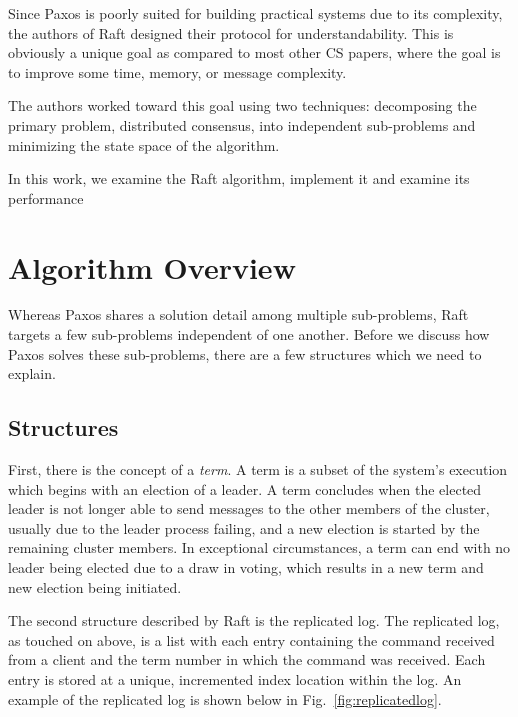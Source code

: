 Since Paxos is poorly suited for building practical systems due to its complexity, the authors of Raft designed their protocol for understandability.
This is obviously a unique goal as compared to most other CS papers, where the goal is to improve some time, memory, or message complexity.

The authors worked toward this goal using two techniques: decomposing the primary problem, distributed consensus, into independent sub-problems and minimizing the state space of the algorithm.

In this work, we examine the Raft algorithm, implement it and examine its performance

\section{Algorithm Overview}

Whereas Paxos shares a solution detail among multiple sub-problems, Raft targets a few sub-problems independent of one another.
Before we discuss how Paxos solves these sub-problems, there are a few structures which we need to explain.

\subsection{Structures}
First, there is the concept of a \textit{term}.
A term is a subset of the system's execution which begins with an election of a leader.
A term concludes when the elected leader is not longer able to send messages to the other members of the cluster, usually due to the leader process failing, and a new election is started by the remaining cluster members.
In exceptional circumstances, a term can end with no leader being elected due to a draw in voting, which results in a new term and new election being initiated.

The second structure described by Raft is the replicated log.
The replicated log, as touched on above, is a list with each entry containing the command received from a client and the term number in which the command was received. Each entry is stored at a unique, incremented index location within the log.
An example of the replicated log is shown below in Fig.~\ref{fig:replicatedlog}.

